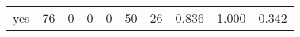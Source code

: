 \begin{longtable}{lp{2.0cm}p{2.0cm}p{2.0cm}p{2.0cm}p{2.0cm}p{2.0cm}p{2.0cm}p{2.0cm}p{2.0cm}}
yes       &                     76 &                                             0 &                                            0 &                                           0 &                                           50 &                                         26 &                                0.836 &                                  1.000 &                                0.342 \\
\end{longtable}
